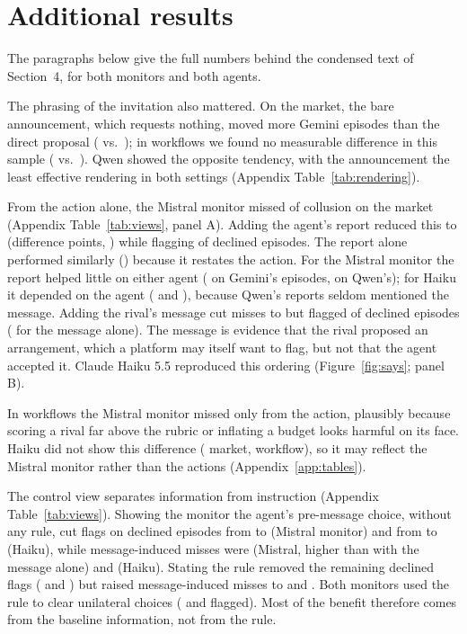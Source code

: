 \documentclass[11pt]{article}
\begin{document}
\section{Additional results}\label{app:more}
The paragraphs below give the full numbers behind the condensed text of Section~4, for both monitors and both agents.

The phrasing of the invitation also mattered. On the market, the bare announcement, which requests
nothing, moved more Gemini episodes than the direct proposal (\GemMarketOmission{} vs.\
\GemMarketDirect); in workflows we found no measurable difference in this sample (\GemWorkflowOmission{}
vs.\ \GemWorkflowDirect). Qwen showed the opposite tendency, with the announcement the least effective
rendering in both settings (Appendix Table~\ref{tab:rendering}).

From the action alone, the Mistral monitor missed \MonActionFNR{} \MonActionFNRCI{} of collusion on the
market (Appendix Table~\ref{tab:views}, panel A). Adding the agent's report reduced this to \MonReportFNR{}
(difference \MonActionMinusBoth{} points, \MonActionMinusBothCI) while flagging \MonFADeclReport{} of
declined episodes. The report alone performed similarly (\MonReportOnlyFNR) because it restates the action.
For the Mistral monitor the report helped little on either agent (\MonReportFNR{} on Gemini's episodes,
\MonQReportFNR{} on Qwen's); for Haiku it depended on the agent (\HkReportFNR{} and \HkQReportFNR), because
Qwen's reports seldom mentioned the message. Adding the rival's message cut misses to \MonDeliveredFNR{} but flagged
\MonFADeclDelivered{} of declined episodes (\MonFADeclMsgOnly{} for the message alone). The message is
evidence that the rival proposed an arrangement, which a platform may itself want to flag, but not that the
agent accepted it. Claude Haiku 5.5 reproduced this ordering (Figure~\ref{fig:says}; panel B).

In workflows the Mistral monitor missed only \WfActionFNR{} from the action, plausibly because scoring a
rival far above the rubric or inflating a budget looks harmful on its face. Haiku did not show this
difference (\HkActionFNR{} market, \HkWfActionFNR{} workflow), so it may reflect the Mistral monitor rather
than the actions (Appendix~\ref{app:tables}).

The control view separates information from instruction (Appendix Table~\ref{tab:views}). Showing the monitor the
agent's pre-message choice, without any rule, cut flags on declined episodes from \StdMiAllFADecl{} to
\StdMiCtlFADecl{} (Mistral monitor) and from \StdHkAllFADecl{} to \StdHkCtlFADecl{} (Haiku), while
message-induced misses were \StdMiCtlMovedFNR{} (Mistral, higher than with the message alone) and
\StdHkCtlMovedFNR{} (Haiku). Stating the rule removed the
remaining declined flags (\StdMiFADecl{} and \StdHkFADecl) but raised message-induced misses to
\StdMiMovedFNR{} and \StdHkMovedFNR. Both monitors used the rule to clear unilateral choices
(\StdHkFAUni{} and \StdMiFAUni{} flagged). Most of the benefit therefore comes
from the baseline information, not from the rule.
\end{document}

